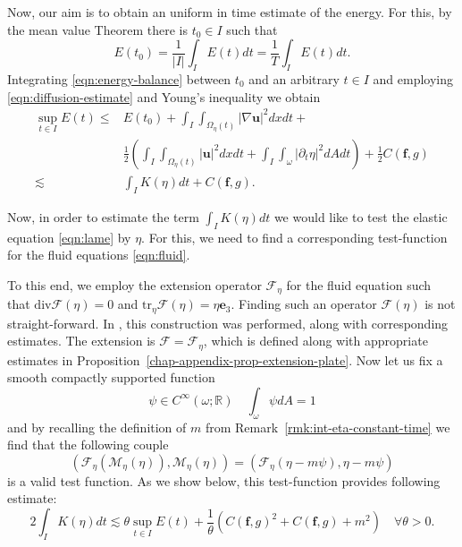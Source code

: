\documentclass[10pt,a4paper]{article}
\numberwithin{equation}{section}
\begin{document}
Now, our aim is to obtain an uniform in time estimate of the energy. For this, by the mean value Theorem there is $t_{0}\in I$ such that 
\[
E\left(t_{0}\right)=\frac{1}{\left|I\right|}\int_{I}E\left(t\right)dt=\frac{1}{T}\int_{I}E\left(t\right)dt.
\]
Integrating \eqref{eqn:energy-balance} between $t_0$ and an arbitrary $t\in I$ and employing \eqref{eqn:diffusion-estimate} and Young's inequality we obtain
\begin{equation}\label{eqn:unif-est-1}
    \begin{aligned}\sup_{t\in I}E\left(t\right)\le & E\left(t_{0}\right)+\int_{I}\int_{\Omega_{\eta}\left(t\right)}\left|\nabla\mathbf{u}\right|^{2}dxdt+\\
 & \frac{1}{2}\left(\int_{I}\int_{\Omega_{\eta}\left(t\right)}\left|\mathbf{u}\right|^{2}dxdt+\int_{I}\int_{\omega}\left|\partial_{t}\eta\right|^{2}dAdt\right)+\frac{1}{2}C\left(\mathbf{f},g\right)\\
\lesssim & \int_{I}K\left(\eta\right)dt+C\left(\mathbf{f},g\right).
\end{aligned}
\end{equation}

Now, in order to estimate the term $\int_{I}K\left(\eta\right)dt$ we would like to test the elastic equation \eqref{eqn:lame} by $\eta$. For this, we need to find a corresponding test-function for the fluid equations \eqref{eqn:fluid}. 

To this end, we employ the extension operator  $\mathcal{F}_{\eta}$ for the fluid equation such that $\text{div} \mathcal{F}(\eta)=0$ and $\text{tr}_{\eta}\mathcal{F}(\eta)=\eta \mathbf{e}_{3} $.  
Finding such an operator $\mathcal{F}(\eta)$ is not straight-forward. In \cite[Proposition 3.3]{MS22}, this construction was performed, along with corresponding  estimates. 
The extension is $\mathcal{F}=\mathcal{F}_{\eta}$, which is defined along with appropriate estimates in Proposition~\ref{chap-appendix-prop-extension-plate}.
Now let us fix a smooth compactly supported function
\begin{equation}\label{eqn:psi-bump-function-test-eta}
\psi\in C^{\infty}\left(\omega;\mathbb{R}\right)\quad \int_{\omega}\psi dA=1
\end{equation}
 and by recalling the definition of $m$ from Remark~\ref{rmk:int-eta-constant-time} we find  that the following couple 
\begin{equation}\label{eqn:test-funct-eta}
\left(\mathcal{F}_{\eta}\left(\mathcal{M}_{\eta}\left(\eta\right)\right),\mathcal{M}_{\eta}\left(\eta\right)\right)=\left(\mathcal{F_{\eta}}\left(\eta-m\psi\right),\eta-m\psi\right)
\end{equation}
is a valid test function. 
As we show below, this test-function  provides following estimate: 
\begin{equation}\label{eqn:formal-claim}
2\int_{I}K\left(\eta\right)dt\lesssim\theta\sup_{t\in I}E\left(t\right)+\frac{1}{\theta}\left(C\left(\mathbf{f},g\right)^{2}+C\left(\mathbf{f},g\right)+m^{2}\right)\quad\forall\theta>0.
\end{equation}
\end{document}
